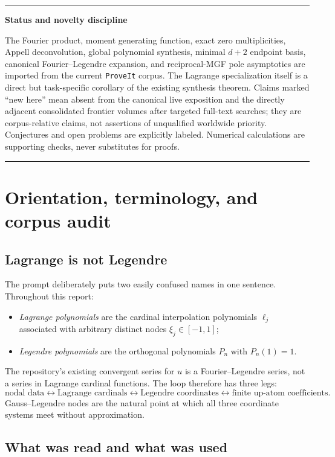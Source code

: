 \documentclass[11pt]{article}
\theoremstyle{definition}
\theoremstyle{remark}
\newenvironment{statusbox}[1]{%
  \par\smallskip\noindent\begin{center}\begin{minipage}{0.94\textwidth}%
  \hrule\vspace{0.55em}\noindent\textbf{#1}\par\smallskip
}{%
  \vspace{0.55em}\hrule\end{minipage}\end{center}\smallskip
}
\begin{document}
\begin{statusbox}{Status and novelty discipline}
The Fourier product, moment generating function, exact zero multiplicities,
Appell deconvolution, global polynomial synthesis, minimal $d+2$ endpoint
basis, canonical Fourier--Legendre expansion, and reciprocal-MGF pole
asymptotics are imported from the current \texttt{ProveIt} corpus.  The
Lagrange specialization itself is a direct but task-specific corollary of the
existing synthesis theorem.  Claims marked ``new here'' mean absent from the
canonical live exposition and the directly adjacent consolidated frontier
volumes after targeted full-text searches; they are corpus-relative claims,
not assertions of unqualified worldwide priority.  Conjectures and open
problems are explicitly labeled.  Numerical calculations are supporting
checks, never substitutes for proofs.
\end{statusbox}

\clearpage
\tableofcontents
\clearpage

\section{Orientation, terminology, and corpus audit}
\label{sec:orientation}

\subsection{Lagrange is not Legendre}

The prompt deliberately puts two easily confused names in one sentence.
Throughout this report:
\begin{itemize}
  \item \emph{Lagrange polynomials} are the cardinal interpolation polynomials
  $\ell_j$ associated with arbitrary distinct nodes $\xi_j\in[-1,1]$;
  \item \emph{Legendre polynomials} are the orthogonal polynomials $P_n$ with
  $P_n(1)=1$.
\end{itemize}
The repository's existing convergent series for $u$ is a Fourier--Legendre
series, not a series in Lagrange cardinal functions.  The loop therefore has
three legs:
\[
 \text{nodal data}
 \longleftrightarrow \text{Lagrange cardinals}
 \longleftrightarrow \text{Legendre coordinates}
 \longleftrightarrow \text{finite up-atom coefficients}.
\]
Gauss--Legendre nodes are the natural point at which all three coordinate
systems meet without approximation.

\subsection{What was read and what was used}
\end{document}
